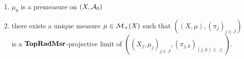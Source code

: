 \documentclass{book}
\begin{document}
\begin{ex}
\begin{enumerate}
			\begin{enumerate}
				\item for each $n \in \N$, there exists $K_n \subset E_n$ such that $K_n$ is compact and $\mu_0(E_n \setminus K_n) < \del2^{-n}$
				\item there exists $(D_n)_{n \in \N} \subset \MA_0$ such that 
				\begin{itemize}
					\item for each $n \in \N$ and $m \in [n]$, $\pi_{j_m}(D_n) \subset K_m$ 
					\item $\bigcap\limits_{n \in \N} D_n = \varnothing$
					\item $\mu_0(B_n \setminus D_n) < \del$
				\end{itemize}
				\item for each $n \in \N$, $\mu_0(D_n) > 0$ 
				\item there exists $(x_n)_{n \in \N} \in \prod\limits_{n \in \N} D_n$ and $(y_{0, m})_{m \in \N} \in \prod\limits_{m \in \N} K_m$ such that for each $m \in \N$, $\lim\limits_{n \rightarrow \infty} \pi_{j_m}(x_n) = y_{0,m}$ \\
				 sequential compactness
				\item there exists $y_0 \in X$ such that for each $m \in \N$, $\pi_{j_m}(y_0) = y_{0,m}$ and $y_0 \in \bigcap\limits_{m \in \N} B_m$\\
				 diagonal argument 
			\end{enumerate}
			\item $\mu_0$ is a premeasure on $(X, \mathcal{A}_0)$\\
			  
			\item there exists a unique measure $\mu \in \mathcal{M}_+(X)$ such that $((X, \mu), (\pi_j)_{j \in J})$ is a $\operatorname{\text{\textbf{TopRadMsr}}}$-projective limit of $((X_j, \mu_j)_{j \in J}, (\pi_{j,k})_{(j,k) \in {\leq}})$. 
		\end{enumerate}
	\end{ex}
	
\end{document}
